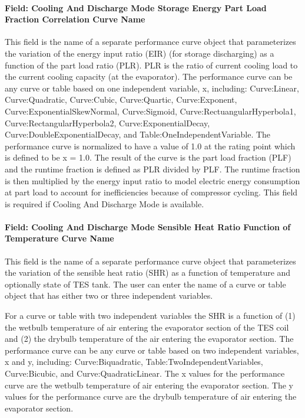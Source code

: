 \paragraph{Field: Cooling And Discharge Mode Storage Energy Part Load Fraction Correlation Curve Name}\label{field-cooling-and-discharge-mode-storage-energy-part-load-fraction-correlation-curve-name}

This field is the name of a separate performance curve object that parameterizes the variation of the energy input ratio (EIR) (for storage discharging) as a function of the part load ratio (PLR). PLR is the ratio of current cooling load to the current cooling capacity (at the evaporator). The performance curve can be any curve or table based on one independent variable, x, including: Curve:Linear, Curve:Quadratic, Curve:Cubic, Curve:Quartic, Curve:Exponent, Curve:ExponentialSkewNormal, Curve:Sigmoid, Curve:RectuangularHyperbola1, Curve:RectangularHyperbola2, Curve:ExponentialDecay, Curve:DoubleExponentialDecay, and Table:OneIndependentVariable. The performance curve is normalized to have a value of 1.0 at the rating point which is defined to be x = 1.0. The result of the curve is the part load fraction (PLF) and the runtime fraction is defined as PLR divided by PLF. The runtime fraction is then multiplied by the energy input ratio to model electric energy consumption at part load to account for inefficiencies because of compressor cycling. This field is required if Cooling And Discharge Mode is available.

\paragraph{Field: Cooling And Discharge Mode Sensible Heat Ratio Function of Temperature Curve Name}\label{field-cooling-and-discharge-mode-sensible-heat-ratio-function-of-temperature-curve-name}

This field is the name of a separate performance curve object that parameterizes the variation of the sensible heat ratio (SHR) as a function of temperature and optionally state of TES tank. The user can enter the name of a curve or table object that has either two or three independent variables.

For a curve or table with two independent variables the SHR is a function of (1) the wetbulb temperature of air entering the evaporator section of the TES coil and (2) the drybulb temperature of the air entering the evaporator section. The performance curve can be any curve or table based on two independent variables, x and y, including: Curve:Biquadratic, Table:TwoIndependentVariables, Curve:Bicubic, and Curve:QuadraticLinear. The x values for the performance curve are the wetbulb temperature of air entering the evaporator section. The y values for the performance curve are the drybulb temperature of air entering the evaporator section.

